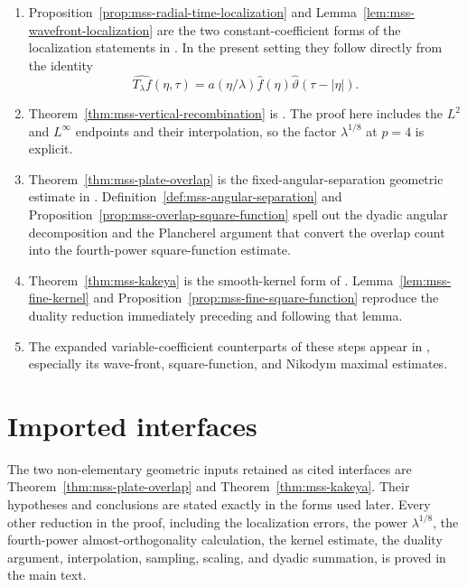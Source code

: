 \documentclass[11pt]{article}
\numberwithin{equation}{section}
\theoremstyle{definition}
\theoremstyle{remark}
\begin{document}
\begin{enumerate}[label=\arabic*.]
\item Proposition~\ref{prop:mss-radial-time-localization} and Lemma~\ref{lem:mss-wavefront-localization} are the two constant-coefficient forms of the localization statements in \cite[Lemma~1.1]{MSS1992}.  In the present setting they follow directly from the identity
\[
\widehat{T_\lambda f}(\eta,\tau)
=a(\eta/\lambda)\widehat f(\eta)\widehat\vartheta(\tau-|\eta|).
\]
\item Theorem~\ref{thm:mss-vertical-recombination} is \cite[Lemma~1.2]{MSS1992}.  The proof here includes the $L^2$ and $L^\infty$ endpoints and their interpolation, so the factor $\lambda^{1/8}$ at $p=4$ is explicit.
\item Theorem~\ref{thm:mss-plate-overlap} is the fixed-angular-separation geometric estimate in \cite[Lemma~1.3 and Appendix]{MSS1992}.  Definition~\ref{def:mss-angular-separation} and Proposition~\ref{prop:mss-overlap-square-function} spell out the dyadic angular decomposition and the Plancherel argument that convert the overlap count into the fourth-power square-function estimate.
\item Theorem~\ref{thm:mss-kakeya} is the smooth-kernel form of \cite[Lemma~1.4]{MSS1992}.  Lemma~\ref{lem:mss-fine-kernel} and Proposition~\ref{prop:mss-fine-square-function} reproduce the duality reduction immediately preceding and following that lemma.
\item The expanded variable-coefficient counterparts of these steps appear in \cite{MSS1993}, especially its wave-front, square-function, and Nikodym maximal estimates.
\end{enumerate}

\section{Imported interfaces}\label{sec:imported-interfaces}

The two non-elementary geometric inputs retained as cited interfaces are Theorem~\ref{thm:mss-plate-overlap} and Theorem~\ref{thm:mss-kakeya}.  Their hypotheses and conclusions are stated exactly in the forms used later.  Every other reduction in the proof, including the localization errors, the power $\lambda^{1/8}$, the fourth-power almost-orthogonality calculation, the kernel estimate, the duality argument, interpolation, sampling, scaling, and dyadic summation, is proved in the main text.
\end{document}
